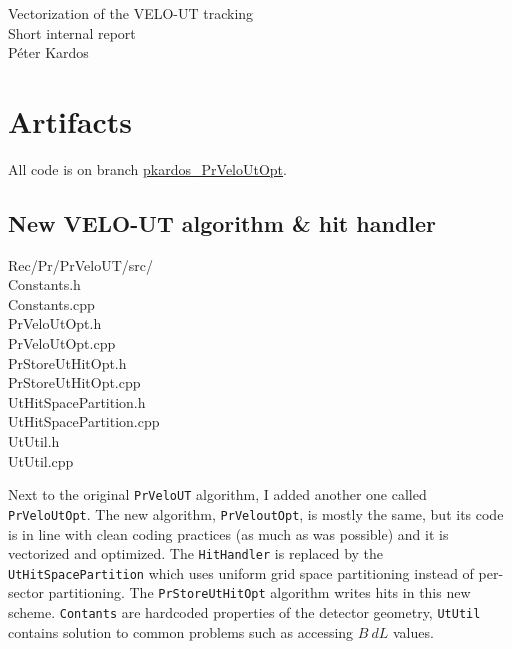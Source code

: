 \documentclass[12pt]{article}
\newcommand\tab[1][.7cm]{\hspace*{#1}}
\newcommand{\code}[1]{\texttt{#1}}
\begin{document}
\begin{center}
	\Huge Vectorization of the VELO-UT tracking\\
	\Large Short internal report\\
	\vspace{1pc}
	\huge Péter Kardos \\
\end{center}



\section{Artifacts}

All code is on branch \href{https://gitlab.cern.ch/lhcb/Rec/tree/pkardos_PrVeloUtOpt}{pkardos\_PrVeloUtOpt}.

\subsection{New VELO-UT algorithm \& hit handler}

\begin{itshape}
    Rec/Pr/PrVeloUT/src/\\
    \tab Constants.h\\
    \tab Constants.cpp\\
    \tab PrVeloUtOpt.h\\
    \tab PrVeloUtOpt.cpp\\
    \tab PrStoreUtHitOpt.h\\
    \tab PrStoreUtHitOpt.cpp\\
    \tab UtHitSpacePartition.h\\
    \tab UtHitSpacePartition.cpp\\
    \tab UtUtil.h\\
    \tab UtUtil.cpp
\end{itshape}

\vspace{1pc}

Next to the original \code{PrVeloUT} algorithm, I added another one called \code{PrVeloUtOpt}. The new algorithm, \code{PrVeloutOpt}, is mostly the same, but its code is in line with clean coding practices (as much as was possible) and it is vectorized and optimized. The \code{HitHandler} is replaced by the \code{UtHitSpacePartition} which uses uniform grid space partitioning instead of per-sector partitioning. The \code{PrStoreUtHitOpt} algorithm writes hits in this new scheme. \code{Contants} are hardcoded properties of the detector geometry, \code{UtUtil} contains solution to common problems such as accessing $B\ dL$ values.
\end{document}
